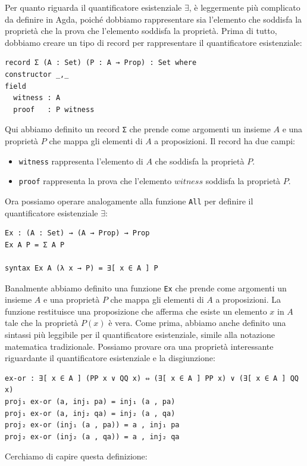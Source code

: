 \documentclass[a4paper]{article}
\theoremstyle{definition}
\theoremstyle{remark}
\begin{document}
Per quanto riguarda il quantificatore esistenziale \( ∃ \), è leggermente più complicato da definire in Agda,
poiché dobbiamo rappresentare sia l'elemento che soddisfa la proprietà che la prova che l'elemento soddisfa la proprietà.
Prima di tutto, dobbiamo creare un tipo di record per rappresentare il quantificatore esistenziale:
\begin{verbatim}
record Σ (A : Set) (P : A → Prop) : Set where
constructor _,_
field
  witness : A
  proof   : P witness
\end{verbatim}
Qui abbiamo definito un record \texttt{Σ} che prende come argomenti un insieme \( A \) e una proprietà \( P \) che mappa gli elementi di \( A \) a proposizioni.
Il record ha due campi:
\begin{itemize}
  \item \texttt{witness} rappresenta l'elemento di \( A \) che soddisfa la proprietà \( P \).
  \item \texttt{proof} rappresenta la prova che l'elemento \( witness \) soddisfa la proprietà \( P \).
\end{itemize}
Ora possiamo operare analogamente alla funzione \texttt{All} per definire il quantificatore esistenziale \( ∃ \):
\begin{verbatim}
Ex : (A : Set) → (A → Prop) → Prop
Ex A P = Σ A P

syntax Ex A (λ x → P) = ∃[ x ∈ A ] P
\end{verbatim}
Banalmente abbiamo definito una funzione \texttt{Ex} che prende come argomenti un insieme \( A \) e una proprietà \( P \) che mappa gli elementi di \( A \) a proposizioni.
La funzione restituisce una proposizione che afferma che esiste un elemento \( x \) in \( A \) tale che la proprietà \( P(x) \) è vera.
Come prima, abbiamo anche definito una sintassi più leggibile per il quantificatore esistenziale, simile 
alla notazione matematica tradizionale.
Possiamo provare ora una proprietà interessante riguardante il quantificatore esistenziale e la disgiunzione:
\begin{verbatim}
ex-or : ∃[ x ∈ A ] (PP x ∨ QQ x) ⇔ (∃[ x ∈ A ] PP x) ∨ (∃[ x ∈ A ] QQ x)
proj₁ ex-or (a, inj₁ pa) = inj₁ (a , pa)
proj₁ ex-or (a, inj₂ qa) = inj₂ (a , qa)
proj₂ ex-or (inj₁ (a , pa)) = a , inj₁ pa
proj₂ ex-or (inj₂ (a , qa)) = a , inj₂ qa
\end{verbatim}
Cerchiamo di capire questa definizione:
\end{document}
